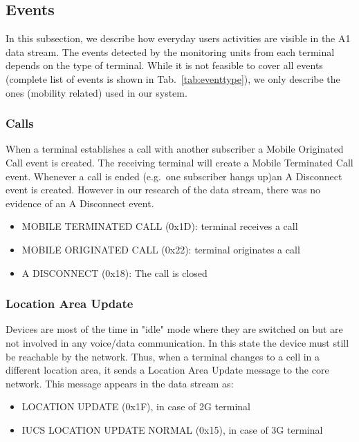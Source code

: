 \subsection{Events}
\label{subsec:events}
In this subsection, we describe how everyday users activities are visible in the A1 data stream. The events detected by the monitoring units from each terminal depends on the type of terminal. While it is not feasible to cover all events (complete list of events is shown in Tab.~\ref{tab:eventtype}), we only describe the ones (mobility related) used in our system. 

\subsubsection{Calls}
When a terminal establishes a call with another subscriber a Mobile Originated Call event is created. The receiving terminal will create a Mobile Terminated Call event. Whenever a call is ended (e.g.\ one subscriber hangs up)an A Disconnect event is created. However in our research of the data stream, there was no evidence of an A Disconnect event.
\begin{itemize}
	\item MOBILE TERMINATED CALL (0x1D): terminal receives a call
	\item MOBILE ORIGINATED CALL (0x22): terminal originates a call
	\item A DISCONNECT (0x18): The call is closed
\end{itemize}
\subsubsection{Location Area Update}
Devices are most of the time in "idle" mode where they are switched on but are not involved in any voice/data communication. In this state the device must still be reachable by the network. Thus, when a terminal changes to a cell in a different location area, it sends a Location Area Update message to the core network.
This message appears in the data stream as:
\begin{itemize}
	\item LOCATION UPDATE (0x1F), in case of 2G terminal
	\item IUCS LOCATION UPDATE NORMAL (0x15), in case of 3G terminal
\end{itemize}

